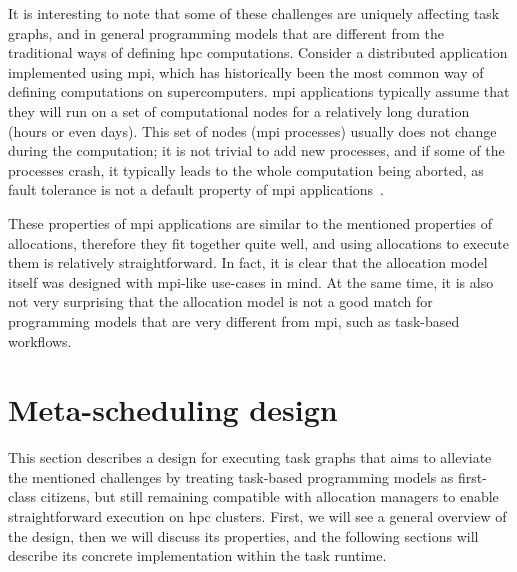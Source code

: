 It is interesting to note that some of these challenges are uniquely affecting task graphs, and in
general programming models that are different from the traditional ways of defining
\gls{hpc} computations. Consider a distributed application implemented using
\gls{mpi}, which has historically been the most common way of defining computations on
supercomputers. \gls{mpi} applications typically assume that they will run on a set of
computational nodes for a relatively long duration (hours or even days). This set of nodes
(\gls{mpi} processes) usually does not change during the computation; it is not
trivial to add new processes, and if some of the processes crash, it typically leads to the whole
computation being aborted, as fault tolerance is not a default property of \gls{mpi}
applications~\cite{fault_tolerant_mpi}.

These properties of \gls{mpi} applications are similar to the mentioned properties of
allocations, therefore they fit together quite well, and using allocations to execute them is
relatively straightforward. In fact, it is clear that the allocation model itself was designed with
\gls{mpi}-like use-cases in mind. At the same time, it is also not very surprising
that the allocation model is not a good match for programming models that are very different from
\gls{mpi}, such as task-based workflows.



\section{Meta-scheduling design}
This section describes a design for executing task graphs that aims to alleviate the mentioned
challenges by treating task-based programming models as first-class citizens, but still remaining
compatible with allocation managers to enable straightforward execution on \gls{hpc}
clusters. First, we will see a general overview of the design, then we will discuss its properties,
and the following sections will describe its concrete implementation within the
\hyperqueue{} task runtime.

